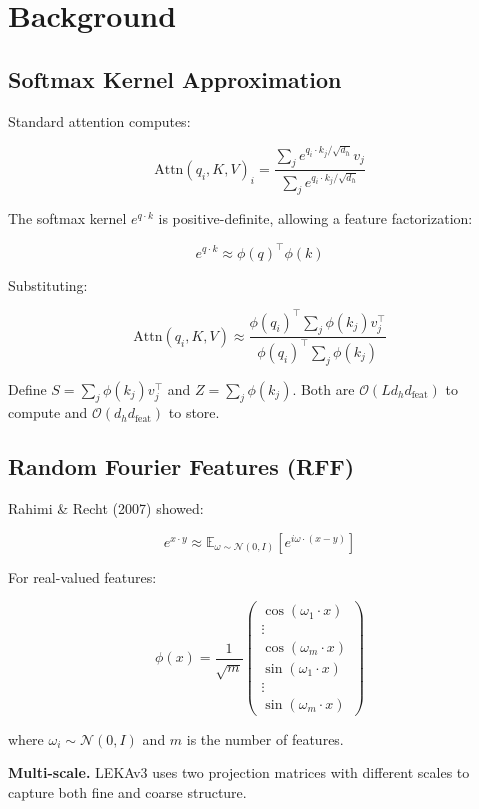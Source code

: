 \section{Background}

\subsection{Softmax Kernel Approximation}

Standard attention computes:

\[
\text{Attn}(q_i, K, V)_i = \frac{\sum_j e^{q_i \cdot k_j / \sqrt{d_h}} v_j}{\sum_j e^{q_i \cdot k_j / \sqrt{d_h}}}
\tag{3.1}
\]

The softmax kernel $e^{q \cdot k}$ is positive-definite, allowing a feature 
factorization:

\[
e^{q \cdot k} \approx \phi(q)^\top \phi(k)
\tag{3.2}
\]

Substituting:

\[
\text{Attn}(q_i, K, V) \approx \frac{\phi(q_i)^\top \sum_j \phi(k_j) v_j^\top}{\phi(q_i)^\top \sum_j \phi(k_j)}
\tag{3.3}
\]

Define $S = \sum_j \phi(k_j) v_j^\top$ and $Z = \sum_j \phi(k_j)$. Both are 
$\mathcal{O}(L d_h d_\text{feat})$ to compute and $\mathcal{O}(d_h d_\text{feat})$ 
to store.

\subsection{Random Fourier Features (RFF)}

Rahimi \& Recht (2007) showed:

\[
e^{x \cdot y} \approx \mathbb{E}_{\omega \sim \mathcal{N}(0, I)}\left[e^{i \omega \cdot (x - y)}\right]
\tag{3.4}
\]

For real-valued features:

\[
\phi(x) = \frac{1}{\sqrt{m}} \begin{pmatrix} \cos(\omega_1 \cdot x) \\ \vdots \\ \cos(\omega_m \cdot x) \\ \sin(\omega_1 \cdot x) \\ \vdots \\ \sin(\omega_m \cdot x) \end{pmatrix}
\tag{3.5}
\]

where $\omega_i \sim \mathcal{N}(0, I)$ and $m$ is the number of features.

\textbf{Multi-scale.} LEKAv3 uses two projection matrices with different scales 
to capture both fine and coarse structure.

